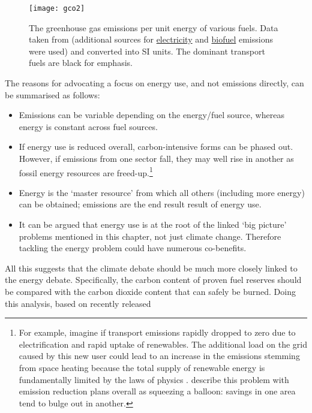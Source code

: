  \begin{figure}[htbp]
  \centerline{
    \texttt{[image: gco2]}}
  \caption[The greenhouse gas emissions per unit energy of various fuels]
{The greenhouse gas emissions per unit energy of various fuels. Data
taken from \citet{Defra2011} (additional sources for
\href{http://www.ipcc.ch/pdf/special-reports/sroc/Tables/t0305.pdf}{\color{blue}electricity}
and
\href{http://www.biomassenergycentre.org.uk/portal/page?_pageid=75,163182&_dad=portal&_schema=PORTAL}{\color{blue}biofuel}
emissions were used)
and converted into SI units. The dominant
transport fuels are black for emphasis.  }
  \label{fgco2}
\end{figure}

The reasons for advocating a focus on energy use,
and not emissions directly, can be summarised as follows:
\begin{itemize}
 \item Emissions can be variable depending on the energy/fuel source, whereas
 energy is constant across fuel sources.
 \item If energy use is reduced overall, carbon-intensive forms can be phased out.
However, if emissions from one sector fall, they may well rise in another as
fossil energy resources are freed-up.\footnote{For
example, imagine if transport emissions rapidly dropped to zero
due to electrification and rapid uptake of renewables. The additional
load on the grid caused by this new user \citep{dyke2010impact} could
lead to an increase in the emissions stemming from space heating because
the total supply of renewable energy is fundamentally
limited by the laws of physics \citep{MacKay2009}. \citet{Berners-Lee2013}
describe this problem with emission reduction plans overall as squeezing
a balloon: savings in one area tend to bulge out in another.}
 \item Energy is the `master resource' from which all others (including more
energy) can be obtained; emissions are the end result result of energy use.
 \item It can be argued that energy use is at the root of the linked `big picture'
problems mentioned in this chapter, not just climate change. Therefore
tackling the energy problem could have numerous co-benefits.
\end{itemize}
All this suggests that the climate debate should be much more closely
linked to the energy debate. Specifically, the carbon content of proven
fuel reserves should be compared with the carbon dioxide content that
can safely be burned. Doing this analysis, based on recently released
